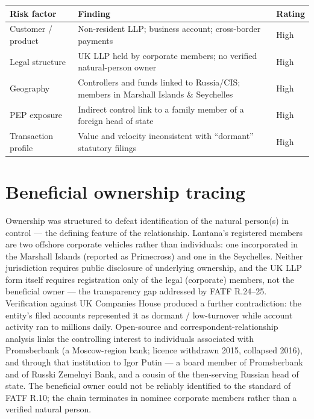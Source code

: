 \documentclass[10.5pt]{article}
\begin{document}
\renewcommand{\arraystretch}{1.25}
\begin{longtable}{@{}L{3.1cm}L{9cm}L{1.8cm}@{}}
\toprule
\textbf{Risk factor} & \textbf{Finding} & \textbf{Rating} \\
\midrule
Customer / product & Non-resident LLP; business account; cross-border payments & High \\
Legal structure & UK LLP held by corporate members; no verified natural-person owner & High \\
Geography & Controllers and funds linked to Russia/CIS; members in Marshall Islands \& Seychelles & High \\
PEP exposure & Indirect control link to a family member of a foreign head of state & High \\
Transaction profile & Value and velocity inconsistent with ``dormant'' statutory filings & High \\
\bottomrule
\end{longtable}

\section{Beneficial ownership tracing}
Ownership was structured to defeat identification of the natural person(s) in control --- the defining feature of the relationship. Lantana's registered members are two offshore corporate vehicles rather than individuals: one incorporated in the Marshall Islands (reported as Primecross) and one in the Seychelles. Neither jurisdiction requires public disclosure of underlying ownership, and the UK LLP form itself requires registration only of the legal (corporate) members, not the beneficial owner --- the transparency gap addressed by FATF R.24--25. Verification against UK Companies House produced a further contradiction: the entity's filed accounts represented it as dormant / low-turnover while account activity ran to millions daily. Open-source and correspondent-relationship analysis links the controlling interest to individuals associated with Promsberbank (a Moscow-region bank; licence withdrawn 2015, collapsed 2016), and through that institution to Igor Putin --- a board member of Promsberbank and of Russki Zemelnyi Bank, and a cousin of the then-serving Russian head of state. The beneficial owner could not be reliably identified to the standard of FATF R.10; the chain terminates in nominee corporate members rather than a verified natural person.
\end{document}
